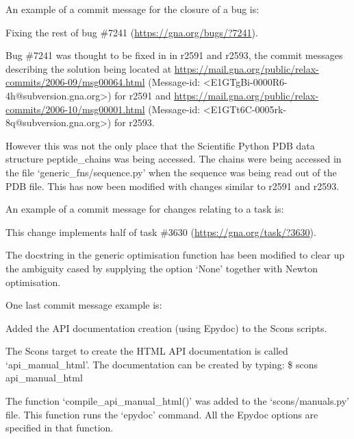 An example of a commit message for the closure of a bug is:

\begin{exampleenv}
Fixing the rest of bug \#7241 (\href{https://gna.org/bugs/?7241}{https://gna.org/bugs/?7241}).

Bug \#7241 was thought to be fixed in in r2591 and r2593, the commit messages describing the solution
being located at \href{https://mail.gna.org/public/relax-commits/2006-09/msg00064.html}{https://mail.gna.org/public/relax-commits/2006-09/msg00064.html} (Message-id:
<E1GTgBi-0000R6-4h@subversion.gna.org>) for r2591 and
\href{https://mail.gna.org/public/relax-commits/2006-10/msg00001.html}{https://mail.gna.org/public/relax-commits/2006-10/msg00001.html} (Message-id:
<E1GTt6C-0005rk-8q@subversion.gna.org>) for r2593.

However this was not the only place that the Scientific Python PDB data structure peptide\_chains was
being accessed.  The chains were being accessed in the file `generic\_fns/sequence.py' when the
sequence was being read out of the PDB file.  This has now been modified with changes similar to
r2591 and r2593.
\end{exampleenv}

An example of a commit message for changes relating to a task is:

\begin{exampleenv}
This change implements half of task \#3630 (\href{https://gna.org/task/?3630}{https://gna.org/task/?3630}).

The docstring in the generic optimisation function has been modified to clear up the ambiguity cased
by supplying the option `None' together with Newton optimisation.
\end{exampleenv}

One last commit message example is:

\begin{exampleenv}
Added the API documentation creation (using Epydoc) to the Scons scripts.

The Scons target to create the HTML API documentation is called `api\_manual\_html'.  The
documentation can be created by typing:
\$ scons api\_manual\_html

The function `compile\_api\_manual\_html()' was added to the `scons/manuals.py' file.  This function
runs the `epydoc' command.  All the Epydoc options are specified in that function.
\end{exampleenv}



